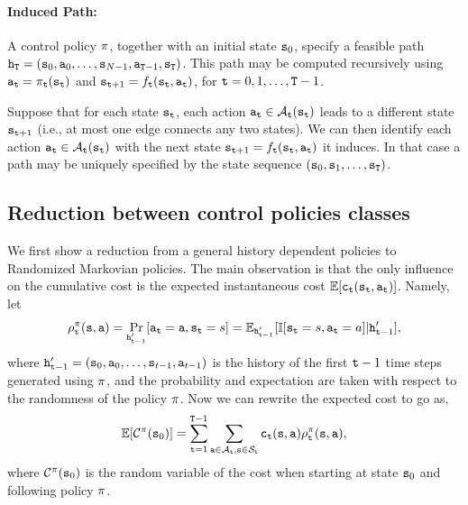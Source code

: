 \paragraph{Induced Path:}
A control policy $\pi $, together with an initial state
${{\tt s}_0}$, specify a feasible path ${{\tt h}_{\tt T}} =
({{\tt s}_0},{{\tt a}_0}, \ldots ,{{\tt s}_{N -
1}},{{\tt a}_{{\tt T} - 1}},{{\tt s}_{\tt T}})$. This path may be
computed recursively using ${{\tt a}_{{\tt t}}} = {\pi
_{{\tt t}}}({{\tt s}_{{\tt t}}})$ and ${{\tt s}_{{\tt t} + 1}} =
{f_{{\tt t}}}({{\tt s}_{{\tt t}}},{{\tt a}_{{\tt t}}})$, for ${\tt t} =
0,1, \ldots ,{\tt T} - 1$.

\begin{remark}
Suppose that for each state ${{\tt s}_{{\tt t}}}$, each action
${{\tt a}_{{\tt t}}} \in {\mathcal{A}_{{\tt t}}}({{\tt s}_{{\tt t}}})$
leads to a different state ${{\tt s}_{{\tt t} + 1}}$ (i.e., at most
one edge connects any two states). We can then identify each action
${{\tt a}_{{\tt t}}} \in {\mathcal{A}_{{\tt t}}}({\tt s}_{{\tt t}})$ with
the next state ${{\tt s}_{{\tt t} + 1}} =
{f_{{\tt t}}}({\tt s}_{{\tt t}},{{\tt a}_{{\tt t}}})$ it induces. In
that case a path may be uniquely specified by the state sequence
$({{\tt s}_0},{{\tt s}_1}, \ldots ,{{\tt s}_{\tt T}})$.
\end{remark}


\subsection{Reduction between control policies classes}

We first show a reduction from a general history dependent policies
to Randomized Markovian policies. The main observation is that the
only influence on the cumulative cost is the expected instantaneous
cost $\mathbb{E}[{\tt c}_{\tt t}({\tt s}_{\tt t},{\tt a}_{\tt t})]$. Namely, let
\[
\rho^\pi_{\tt t}({\tt s},{\tt a})=\Pr_{{\tt h}'_{{\tt t}-1}}
[{\tt a}_{\tt t}={\tt a},{\tt s}_{\tt t}=s]=\mathbb{E}_{{\tt h}'_{{\tt t}-1}}[\mathbb{I}
[{\tt s}_{\tt t}=s,{\tt a}_{\tt t}=a]| {\tt h}'_{{\tt t}-1}],
\]
where
${\tt h}'_{{\tt t}-1}=({\tt s}_0,{\tt a}_0,\ldots,{\tt s}_{t-1},{\tt a}_{t-1})$
is the history of the first ${\tt t}-1$ time steps generated using
$\pi$, and the probability and expectation are taken with
respect to the randomness of the policy $\pi$. Now we can
rewrite the expected cost to go as,
\[
\mathbb{E}[\mathcal{C}^\pi({\tt s}_0)]=\sum_{{\tt t}=1}^{{\tt T}-1}
\sum_{{\tt a}\in \mathcal{A}_{\tt t},{\tt s}\in \mathcal{S}_{\tt t}}
{\tt c}_{\tt t}({\tt s},{\tt a})\rho^\pi_{\tt t}({\tt s},{\tt a}),
\]
where $\mathcal{C}^\pi({\tt s}_0)$ is the random variable of the cost
when starting at state ${\tt s}_0$ and following policy $\pi$.

